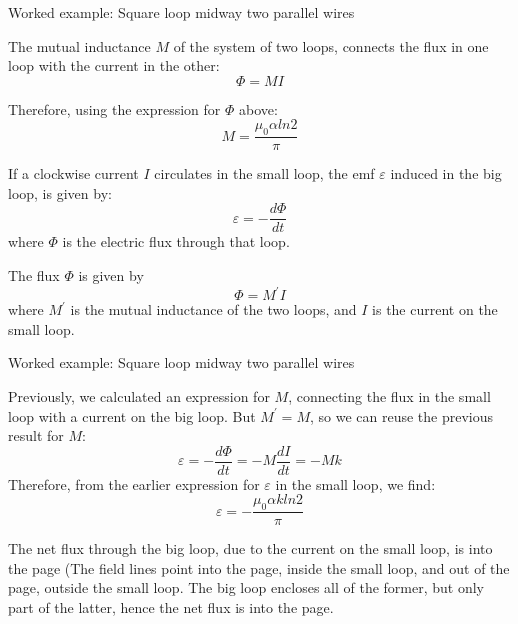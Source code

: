{\begin{frame}{Worked example: Square loop midway two parallel wires}

   The mutual inductance $M$ of the system of two loops,
   connects the flux in one loop with the current in the other:
   \begin{equation*}
     \Phi = M I
   \end{equation*}

   Therefore, using the expression for $\Phi$ above:
   \begin{equation*}
     M = \frac{\mu_0 \alpha ln2}{\pi}
   \end{equation*}

   \vspace{0.2cm}


   If a clockwise current $I$ circulates in the small loop,
   the emf $\varepsilon$ induced in the big loop, is given by:
   \begin{equation*}
     \varepsilon = -\frac{d\Phi}{dt}
   \end{equation*}
   where $\Phi$ is the electric flux through that loop.

   The flux $\Phi$ is given by
   \begin{equation*}
     \Phi = M^\prime I
   \end{equation*}
   where $M^\prime$ is the mutual inductance of the two loops, and
   $I$ is the current on the small loop.

\end{frame}


\begin{frame}{Worked example: Square loop midway two parallel wires}

   Previously, we calculated an expression for $M$, connecting the
   flux in the small loop with a current on the big loop.
   But $M^\prime = M$, so we can reuse the previous result for $M$:
   \begin{equation*}
     \varepsilon = -\frac{d\Phi}{dt} = -M \frac{dI}{dt} = -M k
   \end{equation*}
   Therefore, from the earlier expression for $\varepsilon$
   in the small loop, we find:
   \begin{equation*}
     \varepsilon = - \frac{\mu_0 \alpha k ln2}{\pi}
   \end{equation*}


   The net flux through the big loop, due to the current on the small loop,
   is into the page (The field lines point into the page, inside the small
   loop, and out of the page, outside the small loop. The big loop encloses
   all of the former, but only part of the latter, hence the net flux is
   into the page.\\
   \vspace{0.1cm}


\end{frame}}
